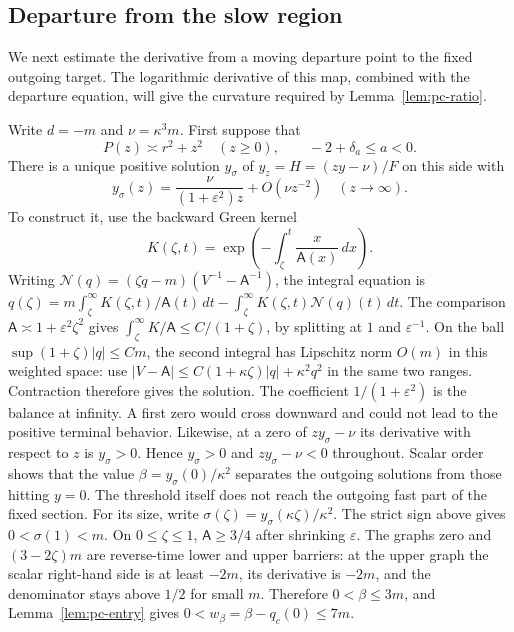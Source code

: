 \subsection{Departure from the slow region}

We next estimate the derivative from a moving departure point to the
fixed outgoing target. The logarithmic derivative of this map, combined
with the departure equation, will give the curvature required by
Lemma~\ref{lem:pc-ratio}.

Write $d=-m$ and $\nu=\kappa^3m$. First suppose that
\begin{equation}
\label{eq:pc-separated-polynomial}
 P(z)\asymp r^2+z^2\quad(z\ge0),\qquad -2+\delta_a\le a<0.
\end{equation}
There is a unique positive solution $y_\sigma$ of $y_z=H=(zy-\nu)/F$
on this side with
\begin{equation}
\label{eq:pc-boundary-tail}
 y_\sigma(z)=\frac{\nu}{(1+\varepsilon^2)z}+O(\nu z^{-2})
 \quad(z\longrightarrow\infty).
\end{equation}
To construct it, use the backward Green kernel
\[
 K(\zeta,t)=\exp\left(-\int_\zeta^t\frac{x}{\mathsf A(x)}\,dx\right).
\]
Writing $\mathcal N(q)=(\zeta q-m)(V^{-1}-\mathsf A^{-1})$,
the integral equation is
$q(\zeta)=m\int_\zeta^\infty K(\zeta,t)/\mathsf A(t)\,dt
          -\int_\zeta^\infty K(\zeta,t)\mathcal N(q)(t)\,dt$.
The comparison $\mathsf A\asymp1+\varepsilon^2\zeta^2$ gives
$\int_\zeta^\infty K/\mathsf A\le C/(1+\zeta)$, by splitting at
$1$ and $\varepsilon^{-1}$. On the ball
$\sup(1+\zeta)|q|\le Cm$, the second integral has Lipschitz norm
$O(m)$ in this weighted space: use
$|V-\mathsf A|\le C(1+\kappa\zeta)|q|+\kappa^2q^2$ in the same
two ranges. Contraction therefore gives the solution. The coefficient
$1/(1+\varepsilon^2)$ is the balance at infinity. A first zero would
cross downward and could not lead to the positive terminal behavior.
Likewise, at a zero of $zy_\sigma-\nu$ its derivative with respect
to $z$ is $y_\sigma>0$. Hence $y_\sigma>0$ and
$zy_\sigma-\nu<0$ throughout. Scalar order shows that the value
$\beta=y_\sigma(0)/\kappa^2$ separates the outgoing solutions from
those hitting $y=0$. The threshold itself does not reach the outgoing
fast part of the fixed section.
For its size, write $\sigma(\zeta)=y_\sigma(\kappa\zeta)/\kappa^2$.
The strict sign above gives $0<\sigma(1)<m$. On $0\le\zeta\le1$,
$\mathsf A\ge3/4$ after shrinking $\varepsilon$. The graphs zero and
$(3-2\zeta)m$ are reverse-time lower and upper barriers: at the upper
graph the scalar right-hand side is at least $-2m$, its derivative is
$-2m$, and the denominator stays above $1/2$ for small $m$.
Therefore $0<\beta\le3m$, and Lemma~\ref{lem:pc-entry} gives
$0<w_\beta=\beta-q_c(0)\le7m$.

